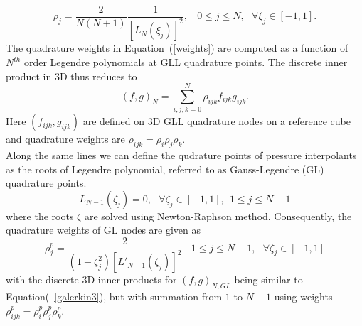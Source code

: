  \begin{equation}
 \rho_j = \frac{2}{N(N+1)}\frac{1}{[L_N(\xi_j)]^2}, \ \ \ \ 0 \le j\le N, \ \ \ \forall \xi_j\in [-1,1]. \label{weights}
 \end{equation}
 The quadrature weights in Equation~(\ref{weights}) are computed as a function of $N^{th}$ order Legendre polynomials at GLL quadrature points. The discrete inner product in 3D thus reduces to
\begin{equation}
(f,g)_{N} = \sum_{i,j,k=0}^{N}\rho_{ijk}f_{ijk}g_{ijk}.\label{galerkin3}
\end{equation}
Here $(f_{ijk},g_{ijk})$ are defined on 3D GLL quadrature nodes on a reference cube and quadrature weights are $\rho_{ijk} = \rho_{i}\rho_{j}\rho_{k}$.\\
Along the same lines we can define the qudrature points of pressure interpolants as the roots of Legendre polynomial, referred to as Gauss-Legendre (GL) quadrature points.
\begin{equation}
L_{N-1}(\zeta_j) = 0, \ \ \ \forall \zeta_j \in [-1, 1], \ \ 1\le j\le N-1 \label{GL}
\end{equation}
where the roots $\zeta$ are solved using Newton-Raphson method. Consequently, the quadrature weights of GL nodes are given as 
\begin{equation}
\rho^{p}_j = \frac{2}{(1 - \zeta_j^{2})[L'_{N-1}(\zeta_j)]^{2}} \ \ \ \ 1 \le j\le N-1, \ \ \ \forall \zeta_j\in [-1,1]
\end{equation}
with the discrete 3D inner products for $(f,g)_{N,GL}$ being similar to Equation(~\ref{galerkin3}), but with summation from $1$ to $N-1$ using weights $\rho^{p}_{ijk} = \rho^{p}_{i}\rho^{p}_{j}\rho^{p}_{k}$.
